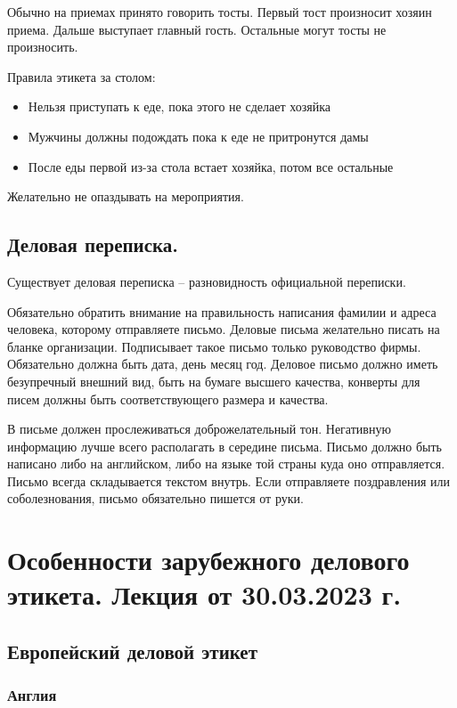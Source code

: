 Обычно на приемах принято говорить тосты. Первый тост произносит хозяин приема. Дальше выступает главный гость. Остальные могут тосты не произносить.

Правила этикета за столом:
\begin{itemize}
\item Нельзя приступать к еде, пока этого не сделает хозяйка
\item Мужчины должны подождать пока к еде не притронутся дамы
\item После еды первой из-за стола встает хозяйка, потом все остальные
\end{itemize}

Желательно не опаздывать на мероприятия. 

\subsection{Деловая переписка.}

Существует деловая переписка – разновидность официальной переписки.

Обязательно обратить внимание на правильность написания фамилии и адреса человека, которому отправляете письмо. Деловые письма желательно писать на бланке организации. Подписывает такое письмо только руководство фирмы. Обязательно должна быть дата, день месяц год. Деловое письмо должно иметь безупречный внешний вид, быть на бумаге высшего качества, конверты для писем должны быть соответствующего размера и качества.

В письме должен прослеживаться доброжелательный тон. Негативную информацию лучше всего располагать в середине письма. Письмо должно быть написано либо на английском, либо на языке той страны куда оно отправляется. Письмо всегда складывается текстом внутрь.
Если отправляете поздравления или соболезнования, письмо обязательно пишется от руки.

\section{Особенности зарубежного делового этикета. Лекция от 30.03.2023 г.}

\subsection{Европейский деловой этикет}

\subsubsection{Англия}

